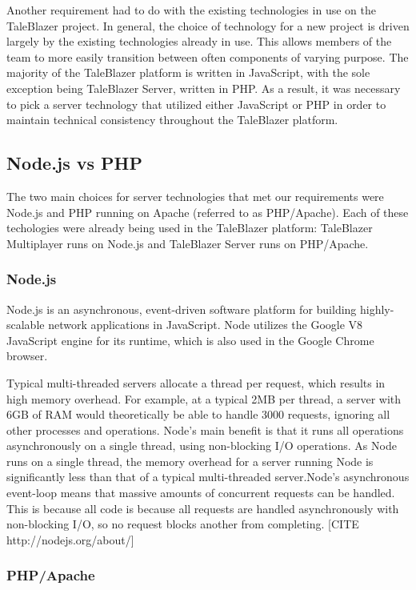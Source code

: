 Another requirement had to do with the existing technologies in use on the TaleBlazer project. In general, the choice of technology for a new project is driven largely by the existing technologies already in use. This allows members of the team to more easily transition between often components of varying purpose. The majority of the TaleBlazer platform is written in JavaScript, with the sole exception being TaleBlazer Server, written in PHP. As a result, it was necessary to pick a server technology that utilized either JavaScript or PHP in order to maintain technical consistency throughout the TaleBlazer platform. 

\subsection{Node.js vs PHP}

The two main choices for server technologies that met our requirements were Node.js and PHP running on Apache (referred to as PHP/Apache). Each of these techologies were already being used in the TaleBlazer platform: TaleBlazer Multiplayer runs on Node.js and TaleBlazer Server runs on PHP/Apache. 

\subsubsection{Node.js}

Node.js is an asynchronous, event-driven software platform for building highly-scalable network applications in JavaScript. Node utilizes the Google V8 JavaScript engine for its runtime, which is also used in the Google Chrome browser. 

Typical multi-threaded servers allocate a thread per request, which results in high memory overhead. For example, at a typical 2MB per thread, a server with 6GB of RAM would theoretically be able to handle 3000 requests, ignoring all other processes and operations. Node's main benefit is that it runs all operations asynchronously on a single thread, using non-blocking I/O operations. As Node runs on a single thread, the memory overhead for a server running Node is significantly less than that of a typical multi-threaded server.Node's asynchronous event-loop means that massive amounts of concurrent requests can be handled. This is because all code is because all requests are handled asynchronously with non-blocking I/O, so no request blocks another from completing. [CITE http://nodejs.org/about/]

\subsubsection{PHP/Apache}

